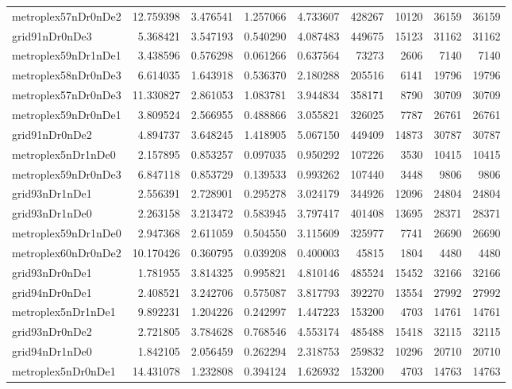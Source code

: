 \documentclass[../../../thesis.tex]{subfiles}
\begin{document}
\begin{longtable}{|l|r|r|r|r|r|r|r|r|}
metroplex57nDr0nDe2 & 12.759398 & 3.476541 & 1.257066 & 4.733607 & 428267 & 10120 & 36159 & 36159 \\
grid91nDr0nDe3 & 5.368421 & 3.547193 & 0.540290 & 4.087483 & 449675 & 15123 & 31162 & 31162 \\
metroplex59nDr1nDe1 & 3.438596 & 0.576298 & 0.061266 & 0.637564 & 73273 & 2606 & 7140 & 7140 \\
metroplex58nDr0nDe3 & 6.614035 & 1.643918 & 0.536370 & 2.180288 & 205516 & 6141 & 19796 & 19796 \\
metroplex57nDr0nDe3 & 11.330827 & 2.861053 & 1.083781 & 3.944834 & 358171 & 8790 & 30709 & 30709 \\
metroplex59nDr0nDe1 & 3.809524 & 2.566955 & 0.488866 & 3.055821 & 326025 & 7787 & 26761 & 26761 \\
grid91nDr0nDe2 & 4.894737 & 3.648245 & 1.418905 & 5.067150 & 449409 & 14873 & 30787 & 30787 \\
metroplex5nDr1nDe0 & 2.157895 & 0.853257 & 0.097035 & 0.950292 & 107226 & 3530 & 10415 & 10415 \\
metroplex59nDr0nDe3 & 6.847118 & 0.853729 & 0.139533 & 0.993262 & 107440 & 3448 & 9806 & 9806 \\
grid93nDr1nDe1 & 2.556391 & 2.728901 & 0.295278 & 3.024179 & 344926 & 12096 & 24804 & 24804 \\
grid93nDr1nDe0 & 2.263158 & 3.213472 & 0.583945 & 3.797417 & 401408 & 13695 & 28371 & 28371 \\
metroplex59nDr1nDe0 & 2.947368 & 2.611059 & 0.504550 & 3.115609 & 325977 & 7741 & 26690 & 26690 \\
metroplex60nDr0nDe2 & 10.170426 & 0.360795 & 0.039208 & 0.400003 & 45815 & 1804 & 4480 & 4480 \\
grid93nDr0nDe1 & 1.781955 & 3.814325 & 0.995821 & 4.810146 & 485524 & 15452 & 32166 & 32166 \\
grid94nDr0nDe1 & 2.408521 & 3.242706 & 0.575087 & 3.817793 & 392270 & 13554 & 27992 & 27992 \\
metroplex5nDr1nDe1 & 9.892231 & 1.204226 & 0.242997 & 1.447223 & 153200 & 4703 & 14761 & 14761 \\
grid93nDr0nDe2 & 2.721805 & 3.784628 & 0.768546 & 4.553174 & 485488 & 15418 & 32115 & 32115 \\
grid94nDr1nDe0 & 1.842105 & 2.056459 & 0.262294 & 2.318753 & 259832 & 10296 & 20710 & 20710 \\
metroplex5nDr0nDe1 & 14.431078 & 1.232808 & 0.394124 & 1.626932 & 153200 & 4703 & 14763 & 14763 \\

\end{longtable}
\end{document}
